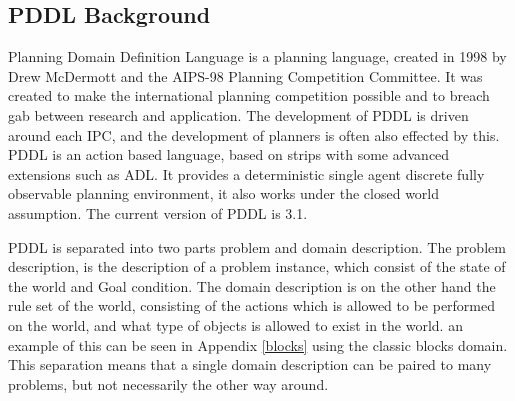 \subsection{PDDL Background}
Planning Domain Definition Language is a planning language, created in 1998 by Drew McDermott and the AIPS-98 Planning Competition Committee. It was created to make the international planning competition possible and to breach gab between research and application. The development of PDDL is driven around each IPC, and the  development of planners is often also effected by this.
PDDL is an action based language, based on strips with some advanced extensions such as ADL. It provides a deterministic single agent discrete fully observable planning environment, it also works under the closed world assumption. The current version of PDDL is 3.1.

PDDL is separated into two parts problem and domain description. The problem description, is the description of a problem instance, which consist of the state of the world and Goal condition. The domain description is on the other hand the rule set of the world, consisting of the actions which is allowed to be performed on the world, and what type of objects is allowed to exist in the world. an example of this can be seen in Appendix \ref{blocks} using the classic blocks domain. This separation means that a single domain description can be paired to many problems, but not necessarily the other way around.

